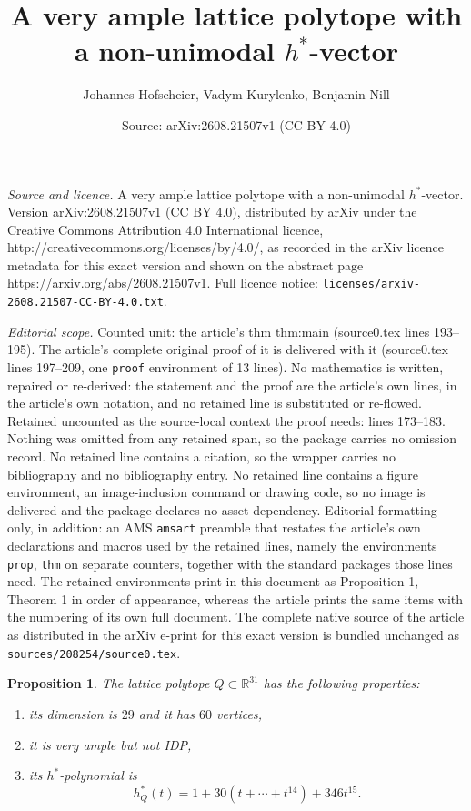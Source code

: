 \documentclass[10pt,a4paper]{amsart}
\title{A very ample lattice polytope with a non-unimodal $h^*$-vector}
\author{Johannes Hofscheier, Vadym Kurylenko, Benjamin Nill}
\date{Source: arXiv:2608.21507v1 (CC BY 4.0)}
\newtheorem{prop}{Proposition}
\newcommand{\R}{\mathbb{R}}
\begin{document}
\maketitle

\noindent\emph{Source and licence.} A very ample lattice polytope with a non-unimodal $h^*$-vector. Version arXiv:2608.21507v1 (CC BY 4.0), distributed by arXiv under the Creative Commons Attribution 4.0 International licence, http://creativecommons.org/licenses/by/4.0/, as recorded in the arXiv licence metadata for this exact version and shown on the abstract page https://arxiv.org/abs/2608.21507v1. Full licence notice: \texttt{licenses/arxiv-2608.21507-CC-BY-4.0.txt}.\par\smallskip

\noindent\textit{Editorial scope.} Counted unit: the article's thm thm:main (source0.tex lines 193--195). The article's complete original proof of it is delivered with it (source0.tex lines 197--209, one \texttt{proof} environment of 13 lines). No mathematics is written, repaired or re-derived: the statement and the proof are the article's own lines, in the article's own notation, and no retained line is substituted or re-flowed.  Retained uncounted as the source-local context the proof needs: lines 173--183.  Nothing was omitted from any retained span, so the package carries no omission record.  No retained line contains a citation, so the wrapper carries no bibliography and no bibliography entry.  No retained line contains a figure environment, an image-inclusion command or drawing code, so no image is delivered and the package declares no asset dependency.  Editorial formatting only, in addition: an AMS \texttt{amsart} preamble that restates the article's own declarations and macros used by the retained lines, namely the environments \texttt{prop}, \texttt{thm} on separate counters, together with the standard packages those lines need.  The retained environments print in this document as Proposition 1, Theorem 1 in order of appearance, whereas the article prints the same items with the numbering of its own full document.  The complete native source of the article as distributed in the arXiv e-print for this exact version is bundled unchanged as \texttt{sources/208254/source0.tex}.
\begin{prop}\label{prop}
    The lattice polytope $Q \subset \R^{31}$ has the following properties:
    \begin{enumerate}
        \item its dimension is $29$ and it has $60$ vertices,
        \item it is very ample but not IDP,
        \item its $h^*$-polynomial is
            \[
                h_Q^*(t)=1+30(t+\cdots+t^{14})+346t^{15}.
            \]
    \end{enumerate}
\end{prop}
\end{document}

